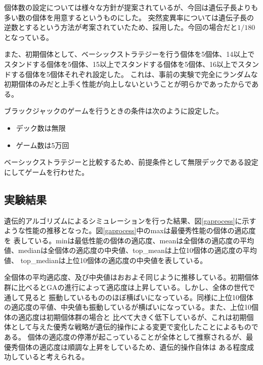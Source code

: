 個体数の設定については様々な方針が提案されているが、今回は遺伝子長よりも多い数の個体を用意するというものにした。
突然変異率については遺伝子長の逆数とするという方法が考案されていたため、採用した。今回の場合だと$1/180$となっている。

また、初期個体として、ベーシックストラテジーを行う個体を5個体、14以上でスタンドする個体を5個体、15以上でスタンドする個体を5個体、16以上でスタンドする個体を5個体それぞれ設定した。
これは、事前の実験で完全にランダムな初期個体のみだと上手く性能が向上しないということが明らかであったからである。

ブラックジャックのゲームを行うときの条件は次のように設定した。

\begin{itemize}
\item デック数は無限
\item ゲーム数は5万回
\end{itemize}

ベーシックストラテジーと比較するため、前提条件として無限デックである設定にしてゲームを行わせた。

\subsection{実験結果}
遺伝的アルゴリズムによるシミュレーションを行った結果、図\ref{gaprocess}に示すような性能の推移となった。図\ref{gaprocess}中のmaxは最優秀性能の個体の適応度を
表している。minは最低性能の個体の適応度、meanは全個体の適応度の平均値、medianは全個体の適応度の中央値、top\_meanは上位10個体の適応度の平均値、
top\_medianは上位10個体の適応度の中央値を表している。

全個体の平均適応度、及び中央値はおおよそ同じように推移している。初期個体群に比べるとGAの進行によって適応度は上昇している。しかし、全体の世代で通して見ると
振動しているもののほぼ横ばいになっている。同様に上位10個体の適応度の平値、中央値も振動しているが横ばいになっている。また、上位10個体の適応度は初期個体群の場合と
比べて大きく低下しているが、これは初期個体として与えた優秀な戦略が遺伝的操作による変更で変化したことによるものである。
個体の適応度の停滞が起こっていることが全体として推察されるが、最優秀個体の適応度は順調な上昇をしているため、遺伝的操作自体は
ある程度成功していると考えられる。

